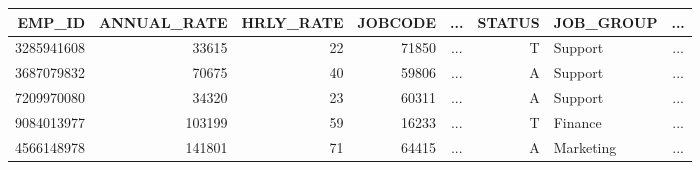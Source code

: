 \begin{tabular}{rrrrcrlc}
    \toprule
    EMP\_ID &  ANNUAL\_RATE &  HRLY\_RATE &  JOBCODE & ... & STATUS &  JOB\_GROUP &  ... \\
    \midrule
    3285941608 &        33615 &         22 &    71850 & ... &  T &    Support &         ... \\
    3687079832 &        70675 &         40 &    59806 & ... &  A &    Support &         ... \\
    7209970080 &        34320 &         23 &    60311 & ... &  A &    Support &         ... \\
    9084013977 &       103199 &         59 &    16233 & ... &  T &    Finance &         ... \\
    4566148978 &       141801 &         71 &    64415 & ... &  A &  Marketing &         ... \\
    \bottomrule
    \end{tabular}
    